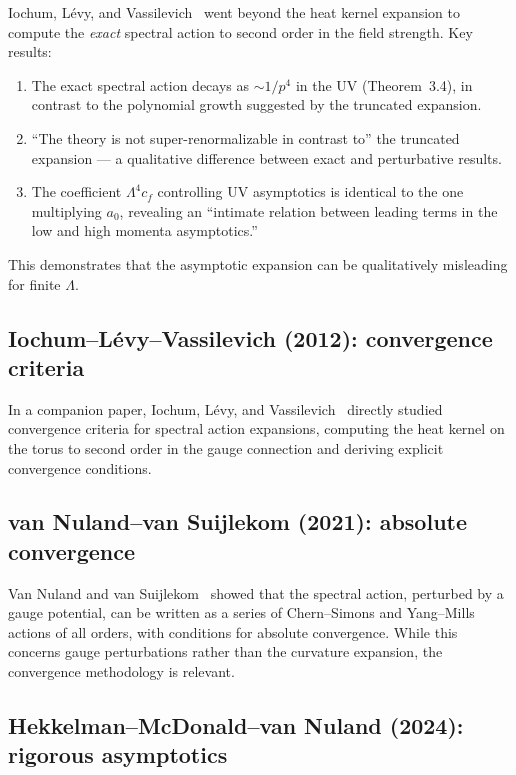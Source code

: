 \documentclass[11pt,a4paper]{article}
\newcommand{\Lam}{\Lambda}
\begin{document}
Iochum, L\'{e}vy, and Vassilevich~\cite{ILV11} went beyond the heat
kernel expansion to compute the \emph{exact} spectral action to second
order in the field strength.  Key results:

\begin{enumerate}
  \item The exact spectral action decays as $\sim 1/p^4$ in the UV
    (Theorem~3.4), in contrast to the polynomial growth suggested by
    the truncated expansion.
  \item ``The theory is not super-renormalizable in contrast to'' the
    truncated expansion --- a qualitative difference between exact and
    perturbative results.
  \item The coefficient $\Lam^4 c_f$ controlling UV asymptotics is
    identical to the one multiplying $a_0$, revealing an ``intimate
    relation between leading terms in the low and high momenta
    asymptotics.''
\end{enumerate}

This demonstrates that the asymptotic expansion can be qualitatively
misleading for finite $\Lam$.

\subsection{Iochum--L\'{e}vy--Vassilevich (2012): convergence criteria}

In a companion paper, Iochum, L\'{e}vy, and Vassilevich~\cite{ILV12}
directly studied convergence criteria for spectral action expansions,
computing the heat kernel on the torus to second order in the gauge
connection and deriving explicit convergence conditions.

\subsection{van Nuland--van Suijlekom (2021): absolute convergence}

Van Nuland and van Suijlekom~\cite{vNvS21} showed that the spectral
action, perturbed by a gauge potential, can be written as a series of
Chern--Simons and Yang--Mills actions of all orders, with conditions
for absolute convergence.  While this concerns gauge perturbations
rather than the curvature expansion, the convergence methodology is
relevant.

\subsection{Hekkelman--McDonald--van Nuland (2024): rigorous asymptotics}
\end{document}
